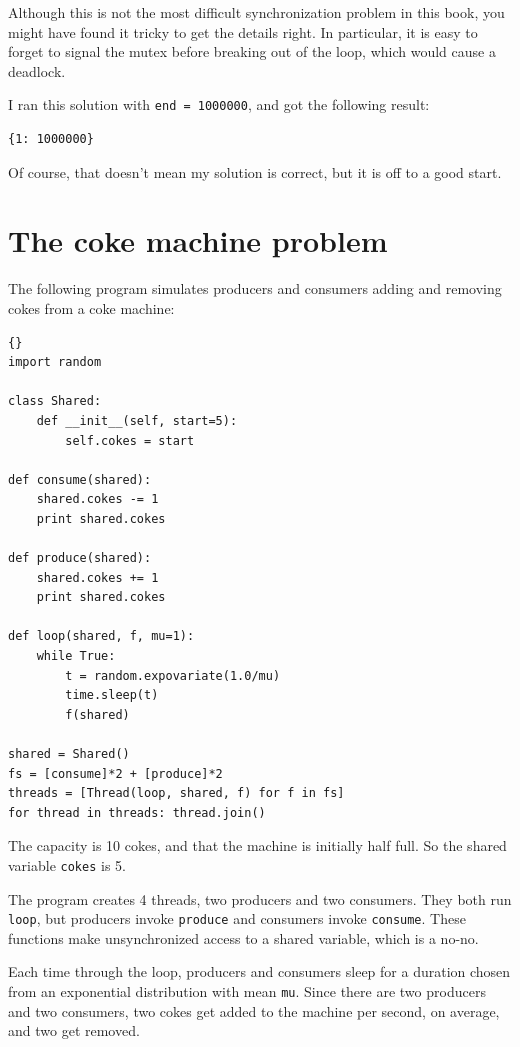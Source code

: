 \documentclass{book}
\newcommand{\clearemptydoublepage}{\newpage\cleardoublepage}
\begin{document}
Although this is not the most difficult synchronization problem
in this book, you might have found it tricky to get the details
right.  In particular, it is easy to forget to signal the mutex
before breaking out of the loop, which would cause a deadlock.

I ran this solution with {\tt end = 1000000}, and got the
following result:

\begin{verbatim}
{1: 1000000}
\end{verbatim}

Of course, that doesn't mean my solution is correct, but it is
off to a good start.


\clearemptydoublepage
\section {The coke machine problem}

The following program simulates producers and consumers
adding and removing cokes from a coke machine:

\begin{lstlisting}[caption={}]{}
import random

class Shared:
    def __init__(self, start=5):
        self.cokes = start

def consume(shared):
    shared.cokes -= 1
    print shared.cokes

def produce(shared):
    shared.cokes += 1
    print shared.cokes

def loop(shared, f, mu=1):
    while True:
        t = random.expovariate(1.0/mu)
        time.sleep(t)
        f(shared)

shared = Shared()
fs = [consume]*2 + [produce]*2 
threads = [Thread(loop, shared, f) for f in fs]
for thread in threads: thread.join()
\end{lstlisting}

The capacity is 10 cokes, and that the machine is initially
half full.  So the shared variable {\tt cokes} is 5.

The program creates 4 threads, two producers and two consumers.
They both run {\tt loop}, but producers invoke {\tt produce}
and consumers invoke {\tt consume}.  These functions make
unsynchronized access to a shared variable, which is a no-no.

Each time through the loop, producers and consumers sleep for a
duration chosen from an exponential distribution with mean {\tt mu}.
Since there are two producers and two consumers, two cokes get added
to the machine per second, on average, and two get removed.
\end{document}
